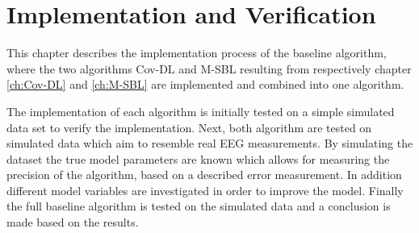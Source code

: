 \chapter{Implementation and Verification}\label{ch:implementation}
This chapter describes the implementation process of the baseline algorithm, where the two algorithms Cov-DL and M-SBL resulting from respectively chapter \ref{ch:Cov-DL} and \ref{ch:M-SBL} are implemented and combined into one algorithm.

The implementation of each algorithm is initially tested on a simple simulated data set to verify the implementation. Next, both algorithm are tested on simulated data which aim to resemble real EEG measurements. By simulating the dataset the true model parameters are known which allows for measuring the precision of the algorithm, based on a described error measurement.     
In addition different model variables are investigated in order to improve the model.
Finally the full baseline algorithm is tested on the simulated data and a conclusion is made based on the results. 







   





